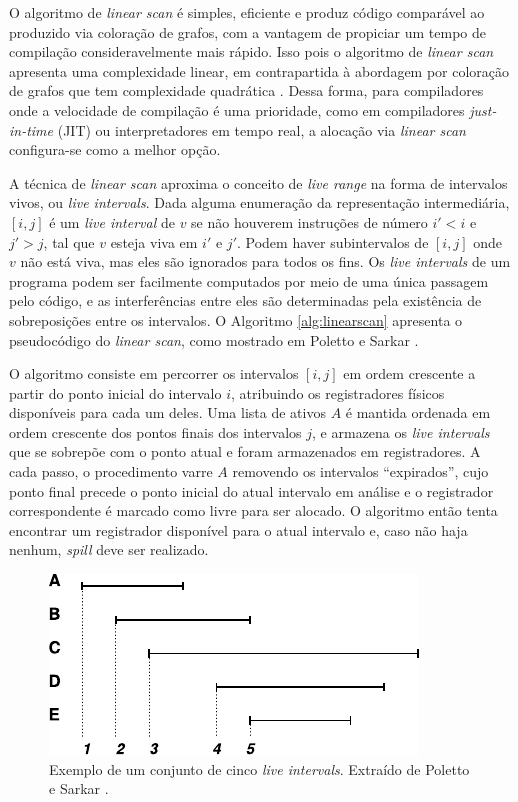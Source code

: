 \documentclass[
	12pt,				%
	openright,			%
	twoside,			%
	a4paper,			%
	tcc,			%
	]{ABNT-DC-UEL}
\begin{document}
O algoritmo de \textit{linear scan} é simples, eficiente e produz código comparável ao produzido via coloração de grafos, com a vantagem de propiciar um tempo de compilação consideravelmente mais rápido. Isso pois o algoritmo de \textit{linear scan} apresenta uma complexidade linear, em contrapartida à abordagem por coloração de grafos que tem complexidade quadrática \cite{johansson:01}. Dessa forma, para compiladores onde a velocidade de compilação é uma prioridade, como em compiladores \textit{just-in-time} (JIT) ou interpretadores em tempo real, a alocação via \textit{linear scan} configura-se como a melhor opção.

A técnica de \textit{linear scan} aproxima o conceito de \textit{live range} na forma de intervalos vivos, ou \textit{live intervals}. Dada alguma enumeração da representação intermediária, $[i,j]$ é um \textit{live interval} de $v$ se não houverem instruções de número $i'<i$ e $j'>j$, tal que $v$ esteja viva em $i'$ e $j'$. Podem haver subintervalos de $[i,j]$ onde $v$ não está viva, mas eles são ignorados para todos os fins. Os \textit{live intervals} de um programa podem ser facilmente computados por meio de uma única passagem pelo código, e as interferências entre eles são determinadas pela existência de sobreposições entre os intervalos. O Algoritmo \ref{alg:linearscan} apresenta o pseudocódigo do \textit{linear scan}, como mostrado em Poletto e Sarkar \cite{poletto:99}.

O algoritmo consiste em percorrer os intervalos $[i,j]$ em ordem crescente a partir do ponto inicial do intervalo $i$, atribuindo os registradores físicos disponíveis para cada um deles. Uma lista de ativos $A$ é mantida ordenada em ordem crescente dos pontos finais dos intervalos $j$, e armazena os \textit{live intervals} que se sobrepõe com o ponto atual e foram armazenados em registradores. A cada passo, o procedimento varre $A$ removendo os intervalos ``expirados'', cujo ponto final precede o ponto inicial do atual intervalo em análise e o registrador correspondente é marcado como livre para ser alocado. O algoritmo então tenta encontrar um registrador disponível para o atual intervalo e, caso não haja nenhum, \textit{spill} deve ser realizado.

\begin{figure}[ht]
    \centering
    \includegraphics[scale=1.3]{linearscan}
    \caption{Exemplo de um conjunto de cinco \textit{live intervals}. Extraído de Poletto e Sarkar \cite{poletto:99}.}
    \label{fig:linearscan}
\end{figure}
\end{document}
